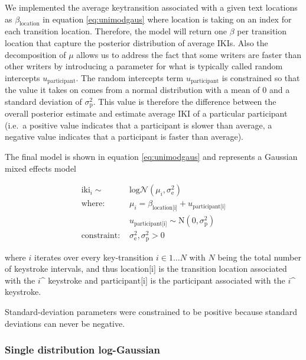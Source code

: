 \documentclass[
  man,floatsintext]{apa7}
\begin{document}
We implemented the average keytransition associated with a given text locations as \(\beta_\text{location}\) in equation \ref{eq:unimodgaus} where \(\text{location}\) is taking on an index for each transition location. Therefore, the model will return one \(\beta\) per transition location that capture the posterior distribution of average IKIs. Also the decomposition of \(\mu\) allows us to address the fact that some writers are faster than other writers by introducing a parameter for what is typically called random intercepts \(u_\text{participant}\). The random intercepts term \(u_\text{participant}\) is constrained so that the value it takes on comes from a normal distribution with a mean of 0 and a standard deviation of \(\sigma_\text{p}^2\). This value is therefore the difference between the overall posterior estimate and estimate average IKI of a particular participant (i.e.~a positive value indicates that a participant is slower than average, a negative value indicates that a participant is faster than average).

The final model is shown in equation \ref{eq:unimodgaus} and represents a Gaussian mixed effects model

\begin{equation}
\begin{aligned}
\label{eq:unimodgaus}
\text{iki}_i \sim\text{ } & \text{log}\mathcal{N}(\mu_i, \sigma_\text{e}^2)\\
\text{where: } & \mu_i = \beta_\text{location[i]} + u_\text{participant[i]}\\
& u_\text{participant[i]} \sim \text{N}(0, \sigma_\text{p}^2)\\
\text{constraint: } & \sigma_\text{e}^2, \sigma_\text{p}^2>0
\end{aligned}
\end{equation}

where \(i\) iterates over every key-transition \(i \in 1 \dots N\) with \(N\) being the total number of keystroke intervals, and thus \(\text{location[i]}\) is the transition location associated with the \(i\)\^{} keystroke and \(\text{participant[i]}\) is the participant associated with the \(i\)\^{} keystroke.

Standard-deviation parameters were constrained to be positive because standard deviations can never be negative.

\hypertarget{single-distribution-log-gaussian}{%
\subsubsection{Single distribution log-Gaussian}\label{single-distribution-log-gaussian}}
\end{document}
